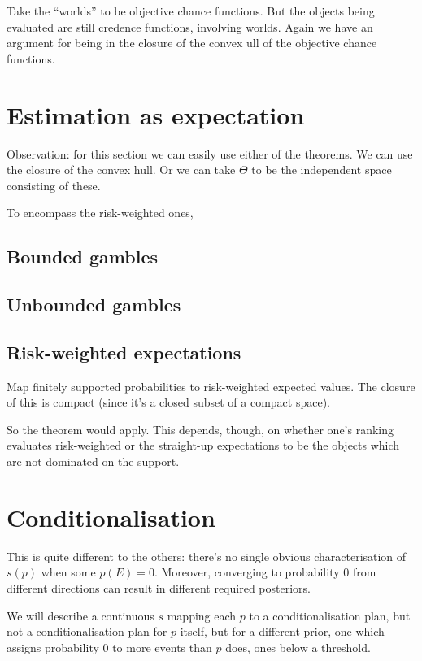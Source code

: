 \documentclass[11pt]{article}
\theoremstyle{definition}
\theoremstyle{remark}
\begin{document}
Take the ``worlds'' to be objective chance functions. But the objects being evaluated are still credence functions, involving worlds. Again we have an argument for being in the closure of the convex ull of the objective chance functions. 

\section{Estimation as expectation}

Observation: for this section we can easily use either of the theorems. We can use the closure of the convex hull. Or we can take $\Theta$ to be the independent space consisting of these. 

To encompass the risk-weighted ones, 


\subsection{Bounded gambles}

\subsection{Unbounded gambles}

\subsection{Risk-weighted expectations}

Map finitely supported probabilities to risk-weighted expected values. 
The closure of this is compact (since it's a closed subset of a compact space). 

So the theorem would apply. This depends, though, on whether one's ranking evaluates risk-weighted or the straight-up expectations to be the objects which are not dominated on the support. 




\section{Conditionalisation}

This is quite different to the others: there's no single obvious characterisation of $s(p)$ when some $p(E)=0$. Moreover, converging to probability $0$ from different directions can result in different required posteriors. 

We will describe a continuous $s$ mapping each $p$ to a conditionalisation plan, but not a conditionalisation plan for $p$ itself, but for a different prior, one which assigns probability 0 to more events than $p$ does, ones below a threshold. 
\end{document}
